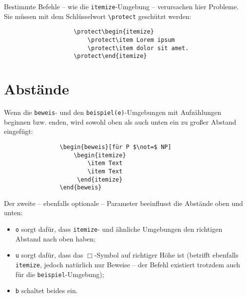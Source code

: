 		\noindent\makebox[\linewidth]{\rule{.7\paperwidth}{0.4pt}}

			\begin{redbox}
				Bestimmte Befehle -- wie \zb die \verb|itemize|-Umgebung -- verursachen hier Probleme. Sie müssen mit dem Schlüsselwort \verb|\protect| geschützt werden:
				\begin{verbatim}
					\protect\begin{itemize}
					    \protect\item Lorem ipsum
					    \protect\item dolor sit amet.
					\protect\end{itemize}
				\end{verbatim}
			\end{redbox}

		\section{Abstände}
			\label{abstaende beweis beispiel}
			Wenn die \texttt{beweis}- und den \texttt{beispiel(e)}-Umgebungen mit Aufzählungen beginnen bzw. enden, wird sowohl oben als auch unten ein zu großer Abstand eingefügt:

			\begin{verbatim}
				\begin{beweis}[für P $\not=$ NP]
				    \begin{itemize}
				        \item Text
				        \item Text
				     \end{itemize}
				\end{beweis}
			\end{verbatim}

			\vspace*{1em}


			Der zweite -- ebenfalls optionale -- Parameter beeinflusst die Abstände oben und unten:
			\begin{itemize}
				\item \texttt o sorgt dafür, dass \texttt{itemize}- und ähnliche Umgebungen den richtigen Abstand nach oben haben;
				\item \texttt u sorgt dafür, dass das $\Box$-Symbol auf richtiger Höhe ist (betrifft ebenfalls \texttt{itemize}, jedoch natürlich nur Beweise -- der Befehl existiert trotzdem auch für die \texttt{beispiel}-Umgebung);
				\item \texttt b schaltet beides ein.
			\end{itemize}


